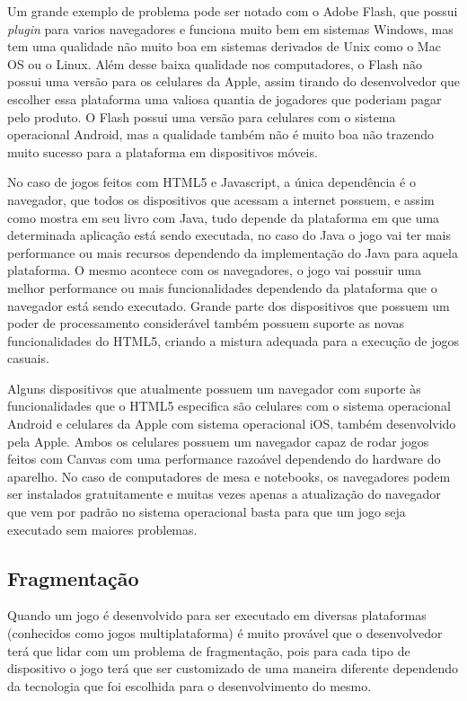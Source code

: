 Um grande exemplo de problema pode ser notado com o Adobe Flash, que possui
\textit{plugin} para varios navegadores e funciona muito bem em sistemas Windows,
mas tem uma qualidade não muito boa em sistemas derivados de Unix como
o Mac OS ou o Linux. Além desse baixa qualidade nos computadores, o
Flash não possui uma versão para os celulares da Apple, assim tirando
do desenvolvedor que escolher essa plataforma uma valiosa quantia de
jogadores que poderiam pagar pelo produto. O Flash possui uma versão
para celulares com o sistema operacional Android, mas a qualidade
também não é muito boa não trazendo muito sucesso para a plataforma em
dispositivos móveis.


No caso de jogos feitos com HTML5 e Javascript, a única dependência é
o navegador, que todos os dispositivos que acessam a internet possuem,
e assim como  mostra em seu livro com
Java, tudo depende da plataforma em que uma determinada aplicação está
sendo executada, no caso do Java o jogo vai ter mais performance ou
mais recursos dependendo da implementação do Java para aquela
plataforma. O mesmo acontece com os navegadores, o jogo vai possuir
uma melhor performance ou mais funcionalidades dependendo da plataforma que
o navegador está sendo executado. Grande parte dos dispositivos que
possuem um poder de processamento considerável também possuem suporte
as novas funcionalidades do HTML5, criando a mistura adequada para a
execução de jogos casuais.

Alguns dispositivos que atualmente possuem um navegador com suporte às
funcionalidades que o HTML5 especifica são celulares com o sistema
operacional Android e celulares da Apple com sistema operacional iOS,
também desenvolvido pela Apple.
Ambos os celulares possuem um navegador capaz de rodar jogos feitos
com Canvas com uma performance razoável dependendo do hardware do
aparelho. No caso de computadores de mesa e notebooks, os navegadores
podem ser instalados gratuitamente e muitas vezes apenas a atualização
do navegador que vem por padrão no sistema operacional basta para que
um jogo seja executado sem maiores problemas.

\subsection{Fragmentação}

Quando um jogo é desenvolvido para ser executado em diversas plataformas
(conhecidos como jogos multiplataforma) é muito provável que o
desenvolvedor terá que lidar com um problema de fragmentação, pois
para cada tipo de dispositivo o jogo terá que ser customizado de uma
maneira diferente dependendo da tecnologia que foi escolhida para o
desenvolvimento do mesmo.

